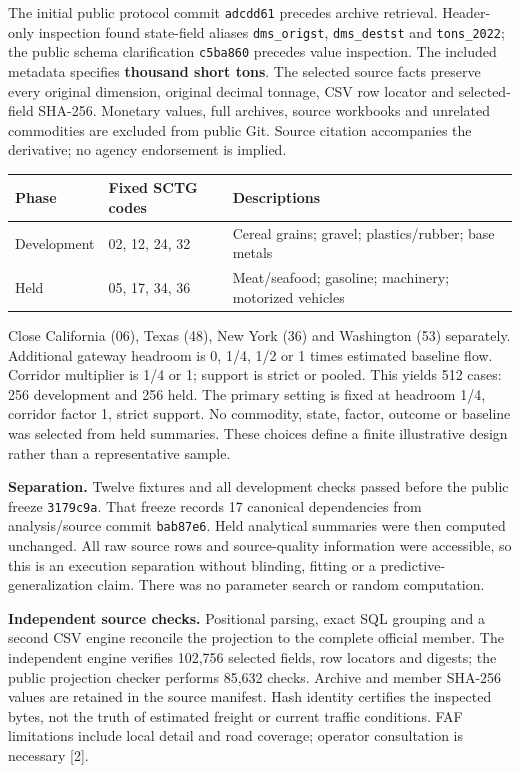 \documentclass[11pt]{article}
\begin{document}
The initial public protocol commit \texttt{adcdd61} precedes archive retrieval. Header-only inspection found state-field aliases \texttt{dms\_origst}, \texttt{dms\_destst} and \texttt{tons\_2022}; the public schema clarification \texttt{c5ba860} precedes value inspection. The included metadata specifies \textbf{thousand short tons}. The selected source facts preserve every original dimension, original decimal tonnage, CSV row locator and selected-field SHA-256. Monetary values, full archives, source workbooks and unrelated commodities are excluded from public Git. Source citation accompanies the derivative; no agency endorsement is implied.

\begin{center}\small
\begin{tabular}{lll}\toprule
Phase & Fixed SCTG codes & Descriptions\\\midrule
Development & 02, 12, 24, 32 & Cereal grains; gravel; plastics/rubber; base metals\\
Held & 05, 17, 34, 36 & Meat/seafood; gasoline; machinery; motorized vehicles\\\bottomrule
\end{tabular}\end{center}

Close California (06), Texas (48), New York (36) and Washington (53) separately. Additional gateway headroom is 0, 1/4, 1/2 or 1 times estimated baseline flow. Corridor multiplier is 1/4 or 1; support is strict or pooled. This yields 512 cases: 256 development and 256 held. The primary setting is fixed at headroom 1/4, corridor factor 1, strict support. No commodity, state, factor, outcome or baseline was selected from held summaries. These choices define a finite illustrative design rather than a representative sample.

\textbf{Separation.} Twelve fixtures and all development checks passed before the public freeze \texttt{3179c9a}. That freeze records 17 canonical dependencies from analysis/source commit \texttt{bab87e6}. Held analytical summaries were then computed unchanged. All raw source rows and source-quality information were accessible, so this is an execution separation without blinding, fitting or a predictive-generalization claim. There was no parameter search or random computation.

\textbf{Independent source checks.} Positional parsing, exact SQL grouping and a second CSV engine reconcile the projection to the complete official member. The independent engine verifies 102,756 selected fields, row locators and digests; the public projection checker performs 85,632 checks. Archive and member SHA-256 values are retained in the source manifest. Hash identity certifies the inspected bytes, not the truth of estimated freight or current traffic conditions. FAF limitations include local detail and road coverage; operator consultation is necessary [2].
\end{document}
